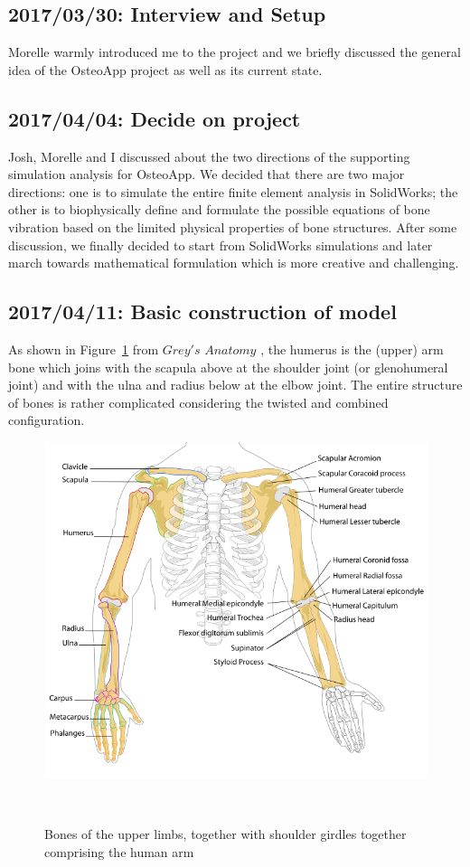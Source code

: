 \documentclass{sigchi}
\begin{document}
\subsection{2017/03/30: Interview and Setup}

Morelle warmly introduced me to the project and we briefly discussed the general idea of the OsteoApp project as well as its current state. 

\subsection{2017/04/04: Decide on project}

Josh, Morelle and I discussed about the two directions of the supporting simulation analysis for OsteoApp. We decided that there are two major directions: one is to simulate the entire finite element analysis in SolidWorks; the other is to biophysically define and formulate the possible equations of bone vibration based on the limited physical properties of bone structures. 
After some discussion, we finally decided to start from SolidWorks simulations and later march towards mathematical formulation which is more creative and challenging.

\subsection{2017/04/11: Basic construction of model}

As shown in Figure~\ref{fig:arm_diagram} from $Grey's$ $Anatomy$ \cite{WikipediaEN:Arm}, the humerus is the (upper) arm bone which joins with the scapula above at the shoulder joint (or glenohumeral joint) and with the ulna and radius below at the elbow joint. The entire structure of bones is rather complicated considering the twisted and combined configuration.


\begin{figure}
\centering
  \includegraphics[width=0.9\columnwidth]{figures/human_arm_bones_diagram}
  \caption{Bones of the upper limbs, together with shoulder girdles together comprising the human arm}~\label{fig:arm_diagram}
\end{figure}
\end{document}
